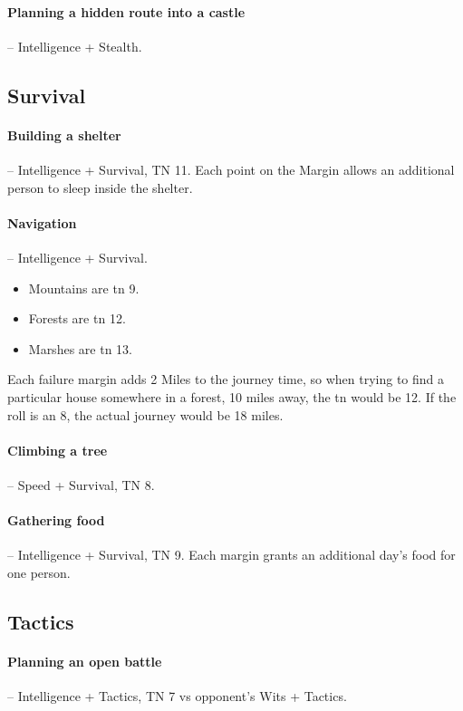 \begin{multicols}{2}
\paragraph{Planning a hidden route into a castle} -- Intelligence + Stealth.

\subsection{Survival}

\paragraph{Building a shelter} -- Intelligence + Survival, TN 11.
Each point on the Margin allows an additional person to sleep inside the shelter.

\paragraph{Navigation} -- Intelligence + Survival.
\label{marching}
\begin{itemize}

	\item
		Mountains are \gls{tn} 9.
	\item
		Forests are \gls{tn} 12.
	\item
		Marshes are \gls{tn} 13.

\end{itemize}
Each failure margin adds 2 Miles to the journey time, so when trying to find a particular house somewhere in a forest, 10 miles away, the \gls{tn} would be 12.
If the roll is an 8, the actual journey would be 18 miles.

\paragraph{Climbing a tree} -- Speed + Survival, TN 8.

\paragraph{Gathering food} -- Intelligence + Survival, TN 9.
Each margin grants an additional day's food for one person.

\subsection{Tactics}

\paragraph{Planning an open battle} -- Intelligence + Tactics, TN 7 vs opponent's Wits + Tactics.


\end{multicols}
